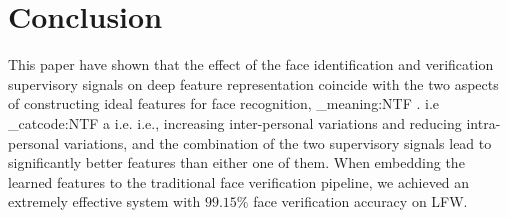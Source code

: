 \documentclass{article} %
\makeatletter
\newcommand\latinabbrev[1]{
  \peek_meaning:NTF . {%
    #1\@}%
  { \peek_catcode:NTF a {%
      #1.\@ }%
    {#1.\@}}}
\def\ie{\latinabbrev{i.e}}
\makeatother
\begin{document}
\section{Conclusion}

This paper have shown that the effect of the face identification and verification supervisory signals on deep feature representation coincide with the two aspects of constructing ideal features for face recognition, \ie, increasing inter-personal variations and reducing intra-personal variations, and the combination of the two supervisory signals lead to significantly better features than either one of them. When embedding the learned features to the traditional face verification pipeline, we achieved an extremely effective system with $\bm{99.15\%}$ face verification accuracy on LFW.


{


}
\end{document}
